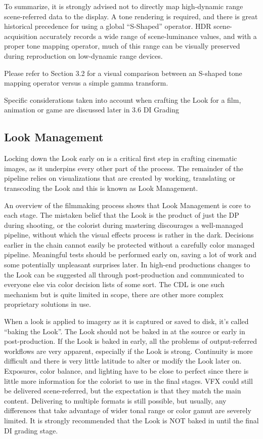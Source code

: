 To summarize, it is strongly advised not to directly map high-dynamic range scene-referred data to the display. A tone rendering is required, and there is great historical precedence for using a global “S-Shaped” operator. HDR scene-acquisition accurately records a wide range of scene-luminance values, and with a proper tone mapping operator, much of this range can be visually preserved during reproduction on low-dynamic range devices.

Please refer to Section 3.2 for a visual comparison between an S-shaped tone mapping operator versus a simple gamma transform.

Specific considerations taken into account when crafting the Look for a film, animation or game are discussed later in 3.6 DI Grading

\subsection{Look Management}

Locking down the Look early on is a critical first step in crafting cinematic images, as it underpins every other part of the process. The remainder of the pipeline relies on visualizations that are created by working, translating or transcoding the Look and this is known as Look Management.

An overview of the filmmaking process shows that Look Management is core to each stage. The mistaken belief that the Look is the product of just the DP during shooting, or the colorist during mastering discourages a well-managed pipeline, without which the visual effects process is rather in the dark. Decisions earlier in the chain cannot easily be protected without a carefully color managed pipeline. Meaningful tests should be performed early on, saving a lot of work and some potentially unpleasant surprises later. In high-end productions changes to the Look can be suggested all through post-production and communicated to everyone else via color decision lists of some sort. The CDL is one such mechanism but is quite limited in scope, there are other more complex proprietary solutions in use.

When a look is applied to imagery as it is captured or saved to disk, it’s called “baking the Look”. The Look should not be baked in at the source or early in post-production. If the Look is baked in early, all the problems of output-referred workflows are very apparent, especially if the Look is strong. Continuity is more difficult and there is very little latitude to alter or modify the Look later on. Exposures, color balance, and lighting have to be close to perfect since there is little more information for the colorist to use in the final stages. VFX could still be delivered scene-referred, but the expectation is that they match the main content. Delivering to multiple formats is still possible, but usually, any differences that take advantage of wider tonal range or color gamut are severely limited. It is strongly recommended that the Look is NOT baked in until the final DI grading stage.
 
